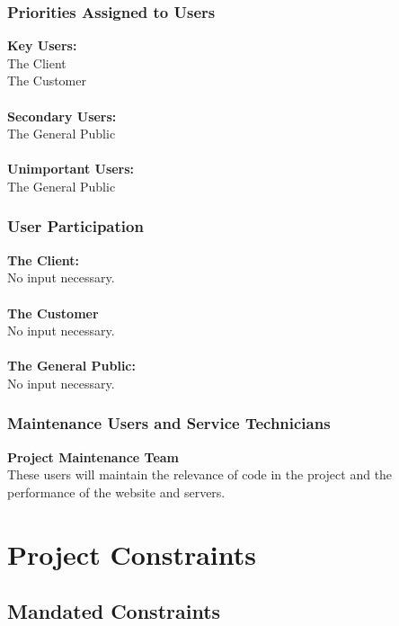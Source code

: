 \documentclass[11pt, oneside]{article}   	%
\begin{document}
\subsubsection*{Priorities Assigned to Users}

\textbf{Key Users:}\\
The Client\\
The Customer\\
\\
\textbf{Secondary Users:}\\
The General Public\\
\\
\textbf{Unimportant Users:}\\
The General Public\\


\subsubsection*{User Participation}
\textbf{The Client:}\\
No input necessary.\\
\\
\textbf{The Customer}\\
No input necessary.\\
\\
\textbf{The General Public:}\\
No input necessary.\\


\subsubsection*{Maintenance Users and Service Technicians}
\textbf{Project Maintenance Team}\\
These users will maintain the relevance of code in the project and the performance of the website and servers.


\newpage
\section*{Project Constraints}
\subsection*{Mandated Constraints}
\end{document}
